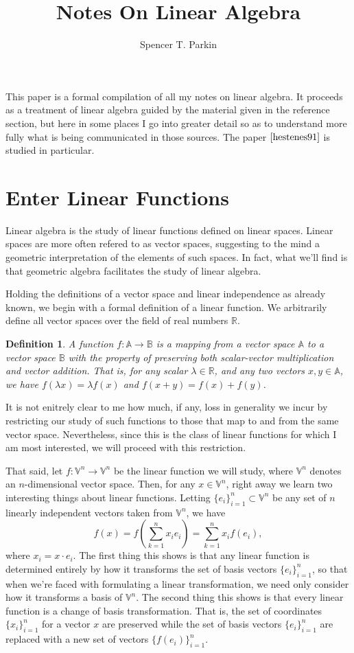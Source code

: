 \documentclass[12pt]{article}
\title{Notes On Linear Algebra}
\author{Spencer T. Parkin}
\newcommand{\V}{\mathbb{V}}
\newcommand{\R}{\mathbb{R}}
\newcommand{\A}{\mathbb{A}}
\newcommand{\B}{\mathbb{B}}
\newtheorem{definition}{Definition}[section]
\begin{document}
\maketitle

This paper is a formal compilation of all my notes on linear algebra.
It proceeds as a treatment of linear algebra guided by the material
given in the reference section, but here in some places I go into greater detail so as
to understand more fully what is being communicated in those sources.
The paper $\cite{hestenes91}$ is studied in particular.
\nocite{macdonald12}
\nocite{hestenes85}

\section{Enter Linear Functions}

Linear algebra is the study of linear functions defined on linear spaces.
Linear spaces are more often refered to as vector spaces, suggesting
to the mind a geometric interpretation of the elements of such spaces.
In fact, what we'll find is that geometric algebra facilitates the study
of linear algebra.

Holding the definitions of a vector space and linear independence as
already known, we begin with a formal definition of a linear function.
We arbitrarily define all vector spaces over the field of real numbers $\R$.
\begin{definition}
A function $f:\A\to\B$ is a mapping from a vector space $\A$ to
a vector space $\B$ with the property of preserving both scalar-vector
multiplication and vector addition.  That is, for any scalar $\lambda\in\R$,
and any two vectors $x,y\in\A$, we have $f(\lambda x)=\lambda f(x)$ and
$f(x+y)=f(x)+f(y)$.
\end{definition}
It is not enitrely clear to me how much, if any, loss in generality we incur
by restricting our study of such functions to those that map to and from
the same vector space.  Nevertheless, since this is the class of linear
functions for which I am most interested, we will proceed with this restriction.

That said, let $f:\V^n\to\V^n$ be the linear function we will study, where $\V^n$
denotes an $n$-dimensional vector space.  Then, for any $x\in\V^n$, right
away we learn two interesting things about linear functions.  Letting $\{e_i\}_{i=1}^n\subset\V^n$
be any set of $n$ linearly independent vectors taken from $\V^n$, we have
\begin{equation}\label{equ_linear_transform}
f(x) = f\left(\sum_{k=1}^n x_i e_i\right) = \sum_{k=1}^n x_i f(e_i),
\end{equation}
where $x_i = x\cdot e_i$.  The first thing this shows is that any linear function
is determined entirely by how it transforms the set of basis vectors $\{e_i\}_{i=1}^n$,
so that when we're faced with formulating a linear transformation, we need only
consider how it transforms a basis of $\V^n$.  The second thing this shows is
that every linear function is a change of basis transformation.  That is, the
set of coordinates $\{x_i\}_{i=1}^n$ for a vector $x$ are preserved while
the set of basis vectors $\{e_i\}_{i=1}^n$ are replaced with a new set
of vectors $\{f(e_i)\}_{i=1}^n$.
\end{document}
